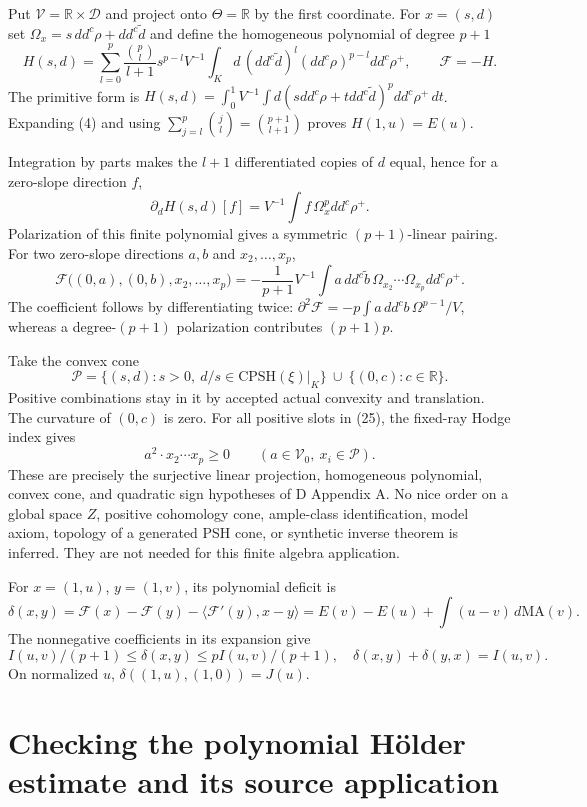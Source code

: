 \documentclass[
  10pt,
]{article}
\begin{document}
Put \(\mathcal V=\mathbb R\times\mathcal D\) and project onto
\(\Theta=\mathbb R\) by the first coordinate. For \(x=(s,d)\) set
\(\Omega_x=s\,dd^c\rho+dd^c\widetilde d\) and define the homogeneous
polynomial of degree \(p+1\) \[
 H(s,d)=\sum_{l=0}^p\frac{{p\choose l}}{l+1}s^{p-l}
 V^{-1}\int_K d\,(dd^c\widetilde d)^l(dd^c\rho)^{p-l}dd^c\rho^+,
 \qquad \mathcal F=-H. \tag{23}
\] The primitive form is
\(H(s,d)=\int_0^1V^{-1}\int d(sdd^c\rho+tdd^c\widetilde d)^pdd^c\rho^+\,dt\).
Expanding (4) and using \(\sum_{j=l}^p{j\choose l}={p+1\choose l+1}\)
proves \(H(1,u)=E(u)\).

Integration by parts makes the \(l+1\) differentiated copies of \(d\)
equal, hence for a zero-slope direction \(f\),
\[\partial_d H(s,d)[f]=V^{-1}\int f\,\Omega_x^p dd^c\rho^+. \tag{24}\]
Polarization of this finite polynomial gives a symmetric
\((p+1)\)-linear pairing. For two zero-slope directions \(a,b\) and
\(x_2,\ldots,x_p\), \[
 \mathcal F\big((0,a),(0,b),x_2,\ldots,x_p\big)
 =-\frac1{p+1}V^{-1}\int a\,dd^c\widetilde b\,
        \Omega_{x_2}\cdots\Omega_{x_p}dd^c\rho^+. \tag{25}
\] The coefficient follows by differentiating twice:
\(\partial^2\mathcal F=-p\int a\,dd^cb\,\Omega^{p-1}/V\), whereas a
degree-\((p+1)\) polarization contributes \((p+1)p\).

Take the convex cone
\[\mathcal P=\{(s,d):s>0,\ d/s\in\mathrm{CPSH}(\xi)|_K\}
              \ \cup\ \{(0,c):c\in\mathbb R\}. \tag{26}\] Positive
combinations stay in it by accepted actual convexity and translation.
The curvature of \((0,c)\) is zero. For all positive slots in (25), the
fixed-ray Hodge index gives
\[a^2\cdot x_2\cdots x_p\ge0\qquad(a\in\mathcal V_0,\ x_i\in\mathcal P). \tag{27}\]
These are precisely the surjective linear projection, homogeneous
polynomial, convex cone, and quadratic sign hypotheses of D Appendix A.
No nice order on a global space \(Z\), positive cohomology cone,
ample-class identification, model axiom, topology of a generated PSH
cone, or synthetic inverse theorem is inferred. They are not needed for
this finite algebra application.

For \(x=(1,u)\), \(y=(1,v)\), its polynomial deficit is
\[\delta(x,y)=\mathcal F(x)-\mathcal F(y)-\langle\mathcal F'(y),x-y\rangle
             =E(v)-E(u)+\int(u-v)\,d\mathrm{MA}(v). \tag{28}\] The
nonnegative coefficients in its expansion give
\[I(u,v)/(p+1)\le\delta(x,y)\le pI(u,v)/(p+1),\quad
 \delta(x,y)+\delta(y,x)=I(u,v). \tag{29}\] On normalized \(u\),
\(\delta((1,u),(1,0))=J(u)\).

\section{Checking the polynomial Hölder estimate and its source
application}\label{checking-the-polynomial-huxf6lder-estimate-and-its-source-application}
\end{document}
